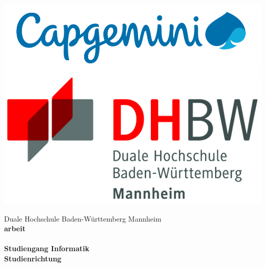 \begin{titlepage}
	\begin{minipage}{\textwidth}
		\vspace{-2cm}
		\noindent \includegraphics[scale=0.25]{Cap_logo.png} \hfill \includegraphics{logo.jpg}
	\end{minipage}
	\vspace{1em}
	\begin{center}
		{\textsf{\large Duale Hochschule Baden-W\"urttemberg Mannheim}}\\[4em]
		{\textsf{\textbf{\large{\DieArtDerArbeit}arbeit}}}\\[6mm]
		{\textsf{\textbf{\Large{}\DerTitelDerArbeit}}} \\[1.5cm]
		{\textsf{\textbf{\large{}Studiengang Informatik}}\\[6mm]
			\textsf{\textbf{Studienrichtung \DieStudienrichtung}}}\vspace{10em}
		

\end{center}
\end{titlepage}
